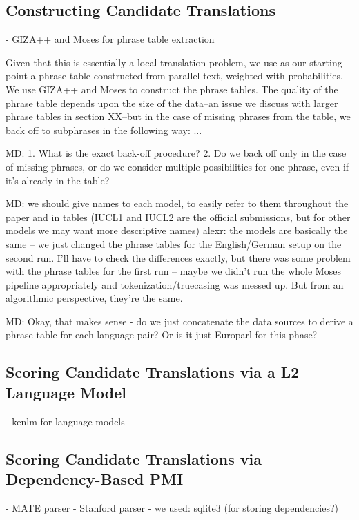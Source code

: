 \documentclass[11pt]{article}
\begin{document}
\subsection{Constructing Candidate Translations}

- GIZA++ and Moses for phrase table extraction

Given that this is essentially a local translation problem, we use as our starting point a phrase table constructed from parallel text, weighted with probabilities.  We use GIZA++ \cite{och:ney:00} and Moses \cite{koehn:hoang:ea:07} to construct the phrase tables.  The quality of the phrase table depends upon the size of the data--an issue we discuss with larger phrase tables in section XX--but in the case of missing phrases from the table, we back off to subphrases in the following way: ...

MD: 1. What is the exact back-off procedure? 2. Do we back off only in the case of missing phrases, or do we consider multiple possibilities for one phrase, even if it’s already in the table?

MD: we should give names to each model, to easily refer to them throughout the paper and in tables (IUCL1 and IUCL2 are the official submissions, but for other models we may want more descriptive names)
alexr: the models are basically the same -- we just changed the phrase tables for the English/German setup on the second run. I'll have to check the differences exactly, but there was some problem with the phrase tables for the first run -- maybe we didn't run the whole Moses pipeline appropriately and tokenization/truecasing was messed up. But from an algorithmic perspective, they're the same.

MD: Okay, that makes sense - do we just concatenate the data sources to derive a phrase table for each language pair?  Or is it just Europarl for this phase?

\subsection{Scoring Candidate Translations via a L2 Language Model}
- kenlm for language models \cite{heafield:kenlm:11}

\subsection{Scoring Candidate Translations via Dependency-Based PMI}
\label{sec:dependencyPMI}

- MATE parser
- Stanford parser
- we used: sqlite3 (for storing dependencies?)
\end{document}
